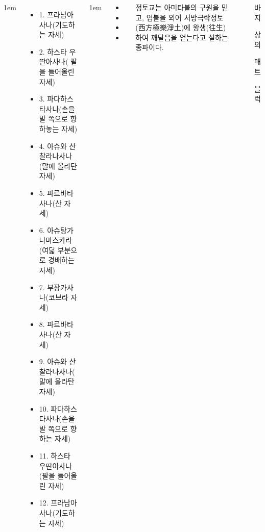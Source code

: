 \documentclass[25pt, a1paper ]{tikzposter}
\begin{document}
\begin{columns}
			{
					\setlength{\leftmargini}{2em}
					\setlength{\labelsep} {1em}
					\begin{itemize}
					\item 1. 프라남아사나(기도하는 자세) 
					\item 2. 하스타 우딴아사나( 팔을 들어올린 자세)
					\item 3. 파다하스타사나(손을 발 쪽으로 향하놓는 자세)
					\item 4. 아슈와 산찰라나사나(말에 올라탄 자세)
					\item 5. 파르바타사나(산 자세)
					\item 6. 아슈탕가 나마스카라(여덟 부분으로 경배하는 자세)
					\item 7. 부장가사나(코브라 자세)
					\item 8. 파르바타사나(산 자세)
					\item 9. 아슈와 산찰라나사나( 말에 올라탄 자세)
					\item 10. 파다하스타사나(손을 발 쪽으로 향하는 자세)
					\item 11. 하스타 우딴아사나(팔을 들어올린 자세)
					\item 12. 프라남아사나(기도하는 자세)
					\end{itemize}
			}

			{
					\setlength{\leftmargini}{3em}
					\setlength{\labelsep} {1em}
				\begin{LARGE}
					\begin{itemize}
					\item 
					\item 
					\item 
					\item 
					\end{itemize}
				\end{LARGE}
			}



		{
			정토교는 아미타불의 구원을 믿고, 
				염불을 외어 서방극락정토(西方極樂淨土)에 왕생(往生)하여 깨달음을 얻는다고 설하는 종파이다.
		}		




			{				
			\setlength{\leftmargini}{5em}			
			\setlength{\labelsep}{1em} %
			\begin{LARGE}
			\begin{itemize}
			\item [바지]
			\item [상의]
			\item [매트]
			\item [블럭]
			\end{itemize}
			\end{LARGE}
		}



\end{columns}
\end{document}
